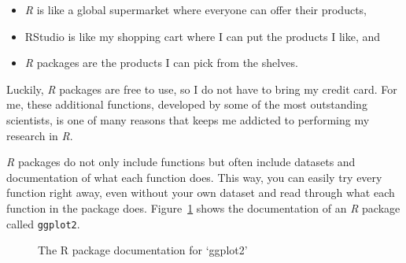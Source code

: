 \documentclass[
  letterpaper,
  DIV=11,
  numbers=noendperiod]{scrreprt}
\begin{document}
\begin{itemize}
\item
  \emph{R} is like a global supermarket where everyone can offer their
  products,
\item
  RStudio is like my shopping cart where I can put the products I like,
  and
\item
  \emph{R} packages are the products I can pick from the shelves.
\end{itemize}

Luckily, \emph{R} packages are free to use, so I do not have to bring my
credit card. For me, these additional functions, developed by some of
the most outstanding scientists, is one of many reasons that keeps me
addicted to performing my research in \emph{R}.

\emph{R} packages do not only include functions but often include
datasets and documentation of what each function does. This way, you can
easily try every function right away, even without your own dataset and
read through what each function in the package does.
Figure~\ref{fig-img-r-package-documentation} shows the documentation of
an \emph{R} package called \texttt{ggplot2}.

\begin{figure}


\caption{\label{fig-img-r-package-documentation}The R package
documentation for `ggplot2'}

\end{figure}%
\end{document}
